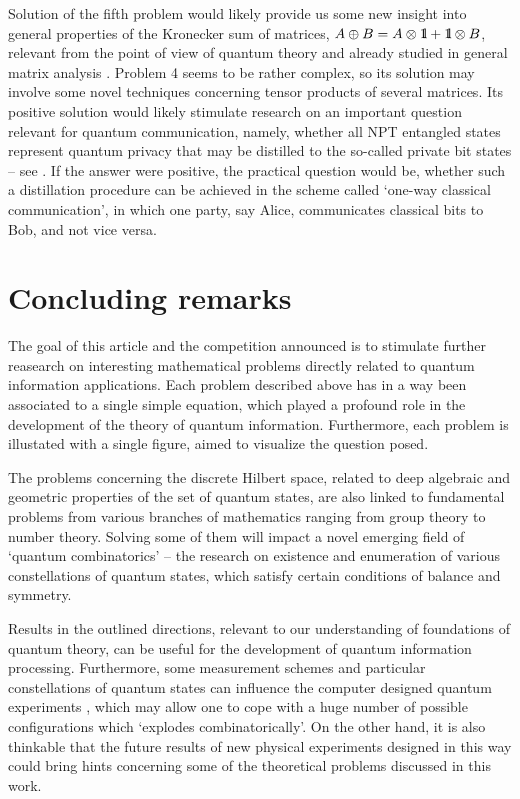 \documentclass[english,aps,pra,nofootinbib,twocolumn,superscriptaddress]{revtex4-1}
\newcommand{\1}{{\rm 1\hspace{-0.9mm}l}}
\begin{document}
 Solution of the fifth problem would likely provide us  some 
new insight into general properties of the Kronecker sum of  matrices,
$A \oplus B=A \otimes \1 + \1 \otimes B$, 
relevant from the point of view of quantum theory and
already studied in general matrix analysis \cite{Topics}. 
 Problem 4 seems to be rather complex, so its solution
 may involve some novel techniques concerning tensor products of several matrices.
Its positive solution would likely stimulate research on 
an important question relevant for quantum communication, namely, whether all 
NPT entangled states represent quantum privacy that may be 
distilled to the so-called private bit states  -- see \cite{HHHO05}.
If the answer were positive, the practical question would be,
whether such a distillation procedure can be achieved in the scheme
 called `one-way classical communication', 
in which one party, say Alice, communicates classical
bits to Bob, and not vice versa.


\section{Concluding remarks}

The goal of this article and the competition announced 
is to stimulate further reasearch on interesting mathematical 
problems directly related to quantum information applications.
Each problem described above has in a way been associated to a single
simple equation, 
which played a profound role in the development of the theory of quantum information.
Furthermore, each problem is illustated with a single figure, 
aimed to visualize the question posed. 

The problems concerning the discrete Hilbert space,
 related to deep algebraic and geometric
properties of  the set of quantum states,
are also linked to fundamental problems
from various branches of mathematics 
ranging from group theory  to number theory.
Solving some of them will impact a novel emerging field
of `quantum combinatorics'  --  the research on
existence and enumeration of various constellations of quantum states,
which satisfy certain conditions of balance and symmetry.

Results in the outlined directions, relevant to
our understanding of foundations of quantum theory,
can be useful for the development of quantum information processing.
Furthermore, some measurement schemes and
particular constellations of quantum states can
influence the computer designed quantum experiments \cite{KEZ20},
which may allow one to cope with a
huge number of  possible configurations which `explodes combinatorically'.
On the other hand, it is also thinkable that  the future results of new 
physical experiments designed in this way could bring hints concerning
some of the theoretical problems discussed in this work.
\end{document}
